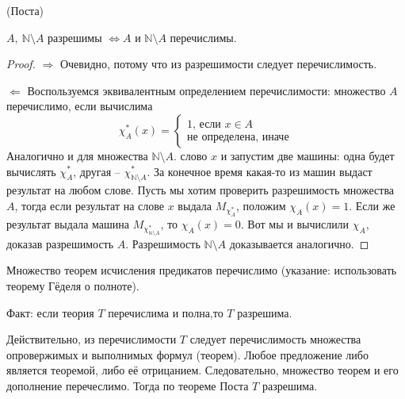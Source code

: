 \par \begin{theorem}{(Поста)}
	\par$A, \ \mathbb{N}\setminus A$ разрешимы $\iff A$ и $\mathbb{N}\setminus A$ перечислимы.
	\begin{proof}
		\par$\Longrightarrow$ Очевидно, потому что из разрешимости следует перечислимость.
		\par$\Longleftarrow$ Воспользуемся эквивалентным определением перечислимости: множество $A$ перечислимо, если
		вычислима \begin{equation*}
			\chi^*_{A}(x) = 
			\begin{cases}
				\text{1, если $x \in A$}\\
				\text{не определена, иначе}
			\end{cases}
		\end{equation*}
		Аналогично и для множества $\mathbb{N}\setminus A$. 
		 слово $x$ и запустим две машины: одна будет вычислять $\chi^*_{A}$, другая --
		$\chi^*_{\mathbb{N}\setminus A}$. За конечное время какая-то из машин выдаст результат на любом слове. Пусть мы
		хотим проверить разрешимость множества $A$, тогда если результат на слове $x$ выдала $M_{\chi^*_{A}}$, положим
		$\chi_{A}(x) = 1$. Если же результат выдала машина $M_{\chi^*_{\mathbb{N}\setminus A}}$, то $\chi_{A}(x) = 0$.
		Вот мы и вычислили $\chi_{A}$, доказав разрешимость $A$. Разрешимость $\mathbb{N}\setminus A$ доказывается
		аналогично.
	\end{proof}
\end{theorem}

\begin{corollary}
	Множество теорем исчисления предикатов перечислимо (указание: использовать теорему Гёделя о полноте).
\end{corollary}
\par Факт: если теория $T$ перечислима и полна,то $T$ разрешима.
\par Действительно, из перечислимости $T$ следует перечислимость множества опровержимых и выполнимых формул
(теорем). Любое предложение либо является теоремой, либо её отрицанием. Следовательно, множество теорем и его
дополнение перечеслимо. Тогда по теореме Поста $T$ разрешима.
